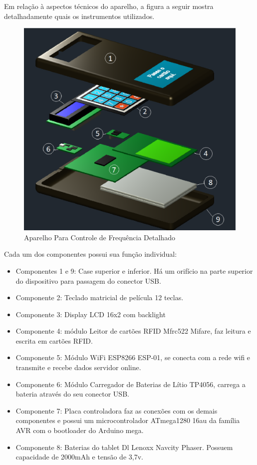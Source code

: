 Em relação à aspectos técnicos do aparelho, a figura a seguir mostra detalhadamente quais os instrumentos utilizados.

\begin{figure}[h]
  \centering
  \includegraphics[keepaspectratio=true,scale=0.45]{figuras/aberto.eps}
  \caption{Aparelho Para Controle de Frequência Detalhado}
\end{figure}

Cada um dos componentes possui sua função individual:
\begin{itemize}
  \item Componentes 1 e 9: Case superior e inferior. Há um orifício na parte superior do dispositivo para passagem do conector USB.
  \item Componente 2: Teclado matricial de película 12 teclas.
  \item Componente 3: Display LCD 16x2 com backlight
  \item Componente 4: módulo Leitor de cartões RFID Mfrc522 Mifare, faz leitura e escrita em cartões RFID.
  \item Componente 5: Módulo WiFi ESP8266 ESP-01, se conecta com a rede wifi e transmite e recebe dados servidor online.
  \item Componente 6: Módulo Carregador de Baterias de Lítio TP4056, carrega a bateria através do seu conector USB.
  \item Componente 7: Placa controladora faz as conexões com os demais componentes e possui um microcontrolador ATmega1280 16au da família AVR com o bootloader do Arduino mega.
  \item Componente 8: Baterias do tablet Dl Lenoxx Navcity Phaser. Possuem capacidade de 2000mAh e tensão de 3,7v.
\end{itemize}


